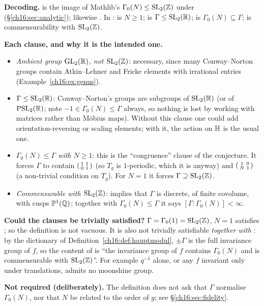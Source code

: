 \begin{dictionary}
\textbf{Decoding.}   is the image of Mathlib's
$\Gamma_0(N)\le\mathrm{SL}_2(\mathbb{Z})$ under  (\S\ref{ch16:sec:analytic}); likewise .  In
:  is $N\ge1$;  is $\Gamma\le\mathrm{SL}_2(\mathbb{R})$;
 is $\Gamma_0(N)\subseteq\Gamma$;  is commensurability with
$\mathrm{SL}_2(\mathbb{Z})$.

\textbf{Each clause, and why it is the intended one.}
\begin{itemize}
\item \emph{Ambient group $\mathrm{GL}_2(\mathbb{R})$, not $\mathrm{SL}_2(\mathbb{Z})$}: necessary, since many Conway--Norton groups contain
  Atkin--Lehner and Fricke elements with irrational entries (Example~\ref{ch16:ex:genus}).
\item \emph{$\Gamma\le\mathrm{SL}_2(\mathbb{R})$}: Conway--Norton's groups are subgroups of $\mathrm{SL}_2(\mathbb{R})$ (or of
  $\mathrm{PSL}_2(\mathbb{R})$; note $-1\in\Gamma_0(N)\le\Gamma$ always, so nothing is lost by working with matrices rather
  than M\"obius maps).  Without this clause one could add orientation-reversing or scaling elements; with it, the
  action on $\mathbb{H}$ is the usual one.
\item \emph{$\Gamma_0(N)\le\Gamma$ with $N\ge1$}: this is the ``congruence'' clause of the conjecture.  It forces
  $\Gamma$ to contain $\left(\begin{smallmatrix}1&1\\0&1\end{smallmatrix}\right)$ (so $T_g$ is $1$-periodic, which it is anyway) and $\left(\begin{smallmatrix}1&0\\N&1\end{smallmatrix}\right)$
  (a non-trivial condition on $T_g$).  For $N=1$ it forces $\Gamma\supseteq\mathrm{SL}_2(\mathbb{Z})$.
\item \emph{Commensurable with $\mathrm{SL}_2(\mathbb{Z})$}: implies that $\Gamma$ is discrete, of finite covolume, with cusps
  $\mathbb{P}^1({\mathbb{Q}})$; together with $\Gamma_0(N)\le\Gamma$ it says $[\Gamma:\Gamma_0(N)]<\infty$.
\end{itemize}
\textbf{Could the clauses be trivially satisfied?}  $\Gamma=\Gamma_0(1)=\mathrm{SL}_2(\mathbb{Z})$, $N=1$ satisfies
; so the definition is not vacuous.  It is also not trivially satisfiable \emph{together with}
: by the dictionary of Definition~\ref{ch16:def:hauptmodul}, $\pm\Gamma$ is the full
invariance group of $f$, so the content of  is ``the invariance group of $f$ contains
$\Gamma_0(N)$ and is commensurable with $\mathrm{SL}_2(\mathbb{Z})$''.  For example $q^{-1}$ alone, or any $f$ invariant only
under translations, admits no moonshine group.

\textbf{Not required (deliberately).}  The definition does not ask that $\Gamma$ normalise $\Gamma_0(N)$, nor that $N$
be related to the order of $g$; see \S\ref{ch16:sec:fidelity}.
\end{dictionary}
